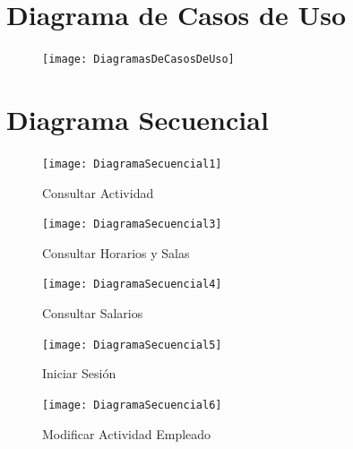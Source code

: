 \documentclass[12pt, fleqn]{report}                             %
\begin{document}
    \clearpage
    \section{Diagrama de Casos de Uso}

        \begin{figure}[h]
            \centering
            \texttt{[image: DiagramasDeCasosDeUso]}
        \end{figure}

    \clearpage
    \section{Diagrama Secuencial}


        \begin{figure}[ht]
            \centering
            \texttt{[image: DiagramaSecuencial1]}
            \caption{Consultar Actividad}
        \end{figure}

        \begin{figure}[ht]
            \centering
            \texttt{[image: DiagramaSecuencial3]}
            \caption{Consultar Horarios y Salas}
        \end{figure}


        \begin{figure}[ht]
            \centering
            \texttt{[image: DiagramaSecuencial4]}
            \caption{Consultar Salarios}
        \end{figure}


        \begin{figure}[ht]
            \centering
            \texttt{[image: DiagramaSecuencial5]}
            \caption{Iniciar Sesión}
        \end{figure}

        \begin{figure}[ht]
            \centering
            \texttt{[image: DiagramaSecuencial6]}
            \caption{Modificar Actividad Empleado}
        \end{figure}
\end{document}
